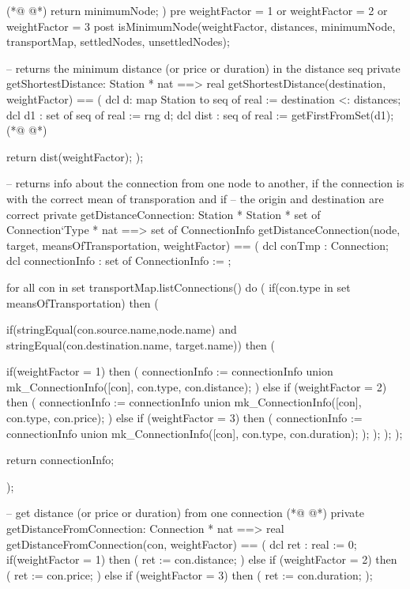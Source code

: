 \begin{vdmpp}[breaklines=true]
(*@
\label{getShortestDistance:202}
@*)
  return minimumNode;
 )
 pre weightFactor = 1 or weightFactor = 2 or weightFactor = 3
 post isMinimumNode(weightFactor, distances, minimumNode, transportMap, settledNodes, unsettledNodes);
 
 -- returns the minimum distance (or price or duration) in the distance seq
 private getShortestDistance: Station * nat ==> real 
 getShortestDistance(destination, weightFactor) == 
 (
  dcl d: map Station to seq of real := {destination} <: distances;
  dcl d1 : set of seq of real := rng d;
  dcl dist : seq of real := getFirstFromSet(d1);
(*@
\label{getDistanceConnection:214}
@*)
  
  return dist(weightFactor);
 );
 
 -- returns info about the connection from one node to another, if the connection is with the correct mean of transporation and if
 -- the origin and destination are correct
 private getDistanceConnection: Station * Station * set of Connection`Type * nat ==> set of ConnectionInfo
 getDistanceConnection(node, target, meansOfTransportation, weightFactor) ==
 (
  dcl conTmp : Connection;
  dcl connectionInfo : set of ConnectionInfo := {};
  
  for all con in set transportMap.listConnections() do (  
   if(con.type in set meansOfTransportation) then (
   
    if(stringEqual(con.source.name,node.name) and stringEqual(con.destination.name, target.name)) then (
     
     if(weightFactor = 1) then (
      connectionInfo := connectionInfo union {mk_ConnectionInfo([con], con.type, con.distance)};
     ) 
     else if (weightFactor = 2) then (
      connectionInfo := connectionInfo union {mk_ConnectionInfo([con], con.type, con.price)};
     )
     else if (weightFactor = 3) then (
      connectionInfo := connectionInfo union {mk_ConnectionInfo([con], con.type, con.duration)};
     );
    );
   );
  );
  
  return connectionInfo;
  
 );
 
 -- get distance (or price or duration) from one connection
(*@
\label{getDistanceFromConnection:249}
@*)
 private getDistanceFromConnection: Connection * nat ==> real
 getDistanceFromConnection(con, weightFactor) ==
 (
  dcl ret : real := 0;
  if(weightFactor = 1) then (
   ret := con.distance;
  ) 
  else if (weightFactor = 2) then (
   ret := con.price;
  )
  else if (weightFactor = 3) then (
   ret := con.duration;
  );
  

\end{vdmpp}
